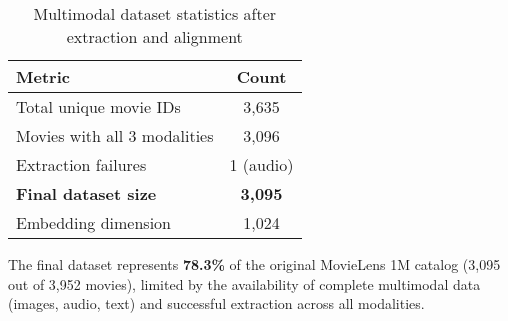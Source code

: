 \begin{table}[h]
\centering
\begin{tabular}{lc}
\hline
\textbf{Metric} & \textbf{Count} \\
\hline
Total unique movie IDs & 3,635 \\
Movies with all 3 modalities & 3,096 \\
Extraction failures & 1 (audio) \\
\textbf{Final dataset size} & \textbf{3,095} \\
Embedding dimension & 1,024 \\
\hline
\end{tabular}
\caption{Multimodal dataset statistics after extraction and alignment}
\end{table}

The final dataset represents \textbf{78.3\%} of the original MovieLens 1M catalog (3,095 out of 3,952 movies), limited by the availability of complete multimodal data (images, audio, text) and successful extraction across all modalities.
